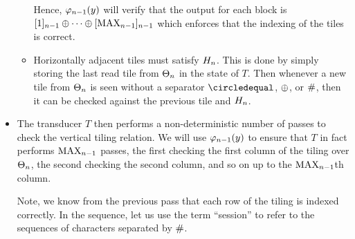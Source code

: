 \begin{itemize}
\begin{itemize}
        Hence,
        $\goodnums{\expheight-1}{y}$
        will verify that the output for each block is
        $\tenc{\expheight-1}{1}
         \numplus \cdots \numplus
         \tenc{\expheight-1}{\nmax{\expheight-1}}$
        which enforces that the indexing of the tiles is correct.

    \item
        Horizontally adjacent tiles must satisfy
        $\hrelnum{\expheight}$.
        This is done by simply storing the last read tile from
        $\tilesnum{\expheight}$
        in the state of $T$.
        Then whenever a new tile from
        $\tilesnum{\expheight}$
        is seen without a separator $\numeq$, $\numplus$, or $\numsep$, then it can be checked against the previous tile and
        $\hrelnum{\expheight}$.
    \end{itemize}

\item
    The transducer $T$ then performs a non-deterministic number of passes to check the vertical tiling relation.
    We will use
    $\goodnums{\expheight-1}{y}$
    to ensure that $T$ in fact performs
    $\nmax{\expheight-1}$
    passes, the first checking the first column of the tiling over
    $\tilesnum{\expheight}$,
    the second checking the second column, and so on up to the
    $\nmax{\expheight-1}$th column.

    Note, we know from the previous pass that each row of the tiling is indexed correctly.
    In the sequence, let us use the term ``session'' to refer to the sequences of characters separated by $\numsep$.


\end{itemize}
